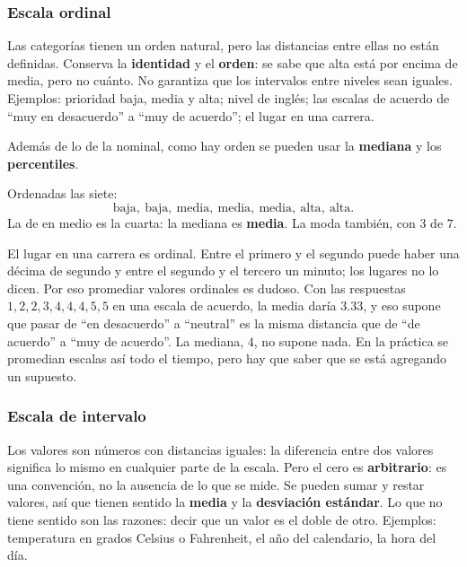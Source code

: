 \documentclass[11pt,letterpaper]{article}
\begin{document}
\subsubsection*{Escala ordinal}

Las categorías tienen un orden natural, pero las distancias entre ellas
no están definidas. Conserva la \textbf{identidad} y el
\textbf{orden}: se sabe que alta está por encima de media, pero no
cuánto. No garantiza que los intervalos entre niveles sean iguales.
Ejemplos: prioridad baja, media y alta; nivel de inglés; las escalas de
acuerdo de ``muy en desacuerdo'' a ``muy de acuerdo''; el lugar en una
carrera.

Además de lo de la nominal, como hay orden se pueden usar la
\textbf{mediana} y los \textbf{percentiles}.

\begin{ejemplo}
    Ordenadas las siete:
    \[
        \text{baja},\ \text{baja},\ \text{media},\ \text{media},\
        \text{media},\ \text{alta},\ \text{alta} .
    \]
    La de en medio es la cuarta: la mediana es \textbf{media}. La moda
    también, con $3$ de $7$.
\end{ejemplo}

\begin{ojo}
    El lugar en una carrera es ordinal. Entre el primero y el segundo
    puede haber una décima de segundo y entre el segundo y el tercero
    un minuto; los lugares no lo dicen. Por eso promediar valores
    ordinales es dudoso. Con las respuestas $1, 2, 2, 3, 4, 4, 4, 5, 5$
    en una escala de acuerdo, la media daría $3.33$, y eso supone que
    pasar de ``en desacuerdo'' a ``neutral'' es la misma distancia que
    de ``de acuerdo'' a ``muy de acuerdo''. La mediana, $4$, no supone
    nada. En la práctica se promedian escalas así todo el tiempo, pero
    hay que saber que se está agregando un supuesto.
\end{ojo}

\subsubsection*{Escala de intervalo}

Los valores son números con distancias iguales: la diferencia entre
dos valores significa lo mismo en cualquier parte de la escala. Pero el
cero es \textbf{arbitrario}: es una convención, no la ausencia de lo
que se mide. Se pueden sumar y restar valores, así que tienen sentido
la \textbf{media} y la \textbf{desviación estándar}. Lo que no tiene
sentido son las razones: decir que un valor es el doble de otro.
Ejemplos: temperatura en grados Celsius o Fahrenheit, el año del
calendario, la hora del día.
\end{document}

